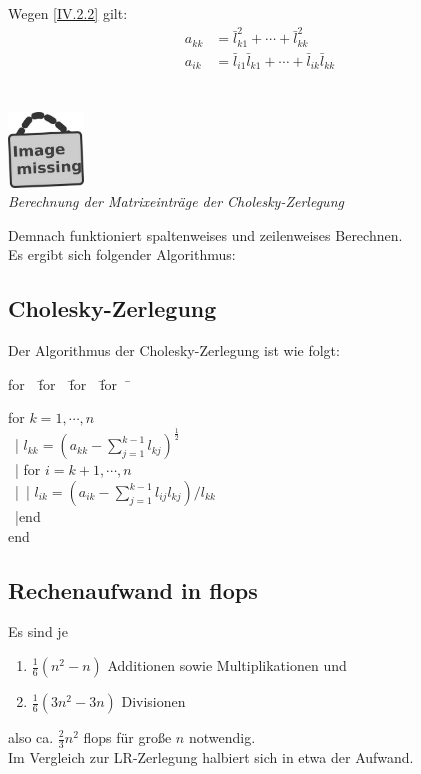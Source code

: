 \documentclass[ngerman,fontsize=11pt, paper=a4, parskip=half, titlepage=true, toc=bib]{scrbook}
\newenvironment{pseudocode}[1]{ %
		\begin{minipage}{#1}
			\begin{framed}
				\hspace*{1em}	
				\begin{minipage}{#1}
					\begin{tabbing}
						for~~\= for~~\= for~~\= for~~\= \kill
	}
	{ %
					\end{tabbing}
				\end{minipage}
				\hspace*{1em}
			\end{framed}
		\end{minipage}
	}
\newcommand{\imagemissing}[1]{
	\begin{center}~\\
		\centering 
		\includegraphics[width=2cm]{images/image_missing.jpg}\\
		\textit{#1} \\
	\end{center}
}
\begin{document}
		Wegen \eqref{IV.2.2} gilt: 
		\begin{align}
			a_{kk} &= \bar{l}_{k1}^{2} + \cdots +  \bar{l}_{kk}^2  \label{IV.2.3} \\
			a_{ik} &= \bar{l}_{i1} \bar{l}_{k1} + \cdots + \bar{l}_{ik} \bar{l}_{kk}  \label{IV.2.4} \\
		\end{align}
		\imagemissing{Berechnung der Matrixeinträge der Cholesky-Zerlegung}
		Demnach funktioniert spaltenweises und zeilenweises Berechnen. \\
		
		Es ergibt sich folgender Algorithmus:
		
		
		\subsection{Cholesky-Zerlegung}
			Der Algorithmus der Cholesky-Zerlegung ist wie folgt:
			
				\begin{pseudocode}{0.55\linewidth}
						for  $k=1, \cdots , n$\\
									~|\> $l_{kk} = (a_{kk}-\sum_{j=1}^{k-1}l_{kj})^{\frac{1}{2}}$ \\
									~|\> for $i= k+1, \cdots , n$ \\
									~|\>~|\> $l_{ik} = ( a_{ik}- \sum_{j=1}^{k-1}l_{ij} l_{kj})/{l_{kk}}$  \\
									~|\>end\\
						end
					\end{pseudocode}
			
			
			
	\subsection{Rechenaufwand in flops}
	Es sind je 
		\begin{enumerate}
			\item[] $\frac{1}{6}(n^2-n) $ Additionen sowie Multiplikationen und 
			\item[]  $\frac{1}{6}(3n^2-3n) $ Divisionen 
		\end{enumerate}
		also ca. $\frac{2}{3} n^2$ flops für große $n$ notwendig. \\
		Im Vergleich zur LR-Zerlegung halbiert sich in etwa der Aufwand.
		
\end{document}
